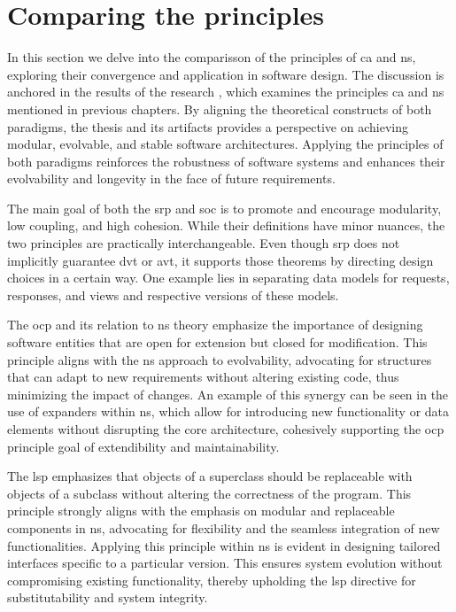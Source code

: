 \section{Comparing the principles} \label{subsec:converging_principles}

In this section we delve into the comparisson of the principles of \gls{ca} and \gls{ns},
exploring their convergence and application in software design. The discussion is anchored
in the results of the research  
\cite{koks_convergence_2023}, which examines the principles \gls{ca} and \gls{ns}
mentioned in previous chapters. By aligning the theoretical constructs of both paradigms,
the thesis and its artifacts provides a perspective on achieving modular, evolvable, and
stable software architectures. Applying the principles of both paradigms reinforces the
robustness of software systems and enhances their evolvability and longevity in the face
of future requirements.

The main goal of both the \gls{srp} and \gls{soc} is to promote and encourage modularity,
low coupling, and high cohesion. While their definitions have minor nuances, the two
principles are practically interchangeable. Even though \gls{srp} does not implicitly
guarantee \gls{dvt} or \gls{avt}, it supports those theorems by directing design choices
in a certain way. One example lies in separating data models for requests, responses, and
views and respective versions of these models.

The \gls{ocp} and its relation to \gls{ns} theory emphasize the importance of designing
software entities that are open for extension but closed for modification. This principle
aligns with the \gls{ns} approach to evolvability, advocating for structures that can
adapt to new requirements without altering existing code, thus minimizing the impact of
changes. An example of this synergy can be seen in the use of expanders within \gls{ns},
which allow for introducing new functionality or data elements without disrupting the core
architecture, cohesively supporting the \gls{ocp} principle goal of extendibility and
maintainability.

The \gls{lsp} emphasizes that objects of a superclass should be replaceable with objects
of a subclass without altering the correctness of the program. This principle strongly
aligns with the emphasis on modular and replaceable components in \gls{ns}, advocating for
flexibility and the seamless integration of new functionalities. Applying this principle
within \gls{ns} is evident in designing tailored interfaces specific to a particular
version. This ensures system evolution without compromising existing functionality,
thereby upholding the \gls{lsp} directive for substitutability and system integrity.

